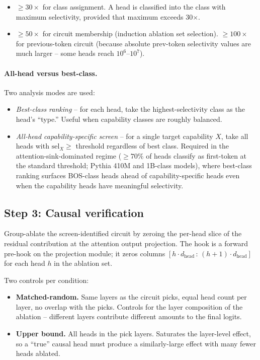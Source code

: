 \documentclass[11pt]{article}
\begin{document}
\begin{itemize}[leftmargin=*,topsep=2pt,itemsep=2pt]
\item $\geq 30\times$ for class assignment. A head is classified into the class with maximum selectivity, provided that maximum exceeds 30$\times$.
\item $\geq 50\times$ for circuit membership (induction ablation set selection). $\geq 100\times$ for previous-token circuit (because absolute prev-token selectivity values are much larger -- some heads reach $10^6$--$10^7$).
\end{itemize}

\paragraph{All-head versus best-class.} Two analysis modes are used:

\begin{itemize}[leftmargin=*,topsep=2pt,itemsep=2pt]
\item \emph{Best-class ranking} -- for each head, take the highest-selectivity class as the head's ``type.'' Useful when capability classes are roughly balanced.
\item \emph{All-head capability-specific screen} -- for a single target capability $X$, take all heads with $\mathrm{sel}_X \geq$ threshold regardless of best class. Required in the attention-sink-dominated regime ($\geq 70\%$ of heads classify as first-token at the standard threshold; Pythia 410M and 1B-class models), where best-class ranking surfaces BOS-class heads ahead of capability-specific heads even when the capability heads have meaningful selectivity.
\end{itemize}

\subsection{Step 3: Causal verification}
\label{sec:step3}

Group-ablate the screen-identified circuit by zeroing the per-head slice of the residual contribution at the attention output projection. The hook is a forward pre-hook on the projection module; it zeros columns $[h\cdot d_{\mathrm{head}}\,{:}\,(h{+}1)\cdot d_{\mathrm{head}}]$ for each head $h$ in the ablation set.

Two controls per condition:

\begin{itemize}[leftmargin=*,topsep=2pt,itemsep=2pt]
\item \textbf{Matched-random.} Same layers as the circuit picks, equal head count per layer, no overlap with the picks. Controls for the layer composition of the ablation -- different layers contribute different amounts to the final logits.
\item \textbf{Upper bound.} All heads in the pick layers. Saturates the layer-level effect, so a ``true'' causal head must produce a similarly-large effect with many fewer heads ablated.
\end{itemize}
\end{document}
